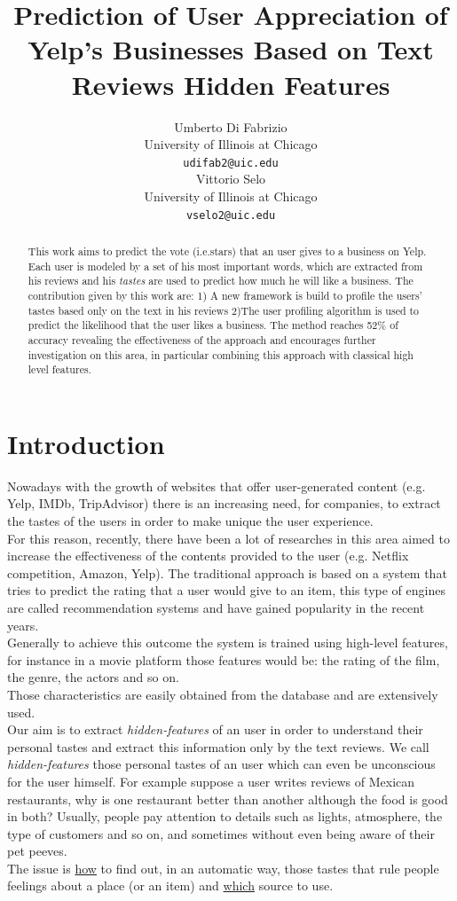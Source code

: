 \documentclass[11pt]{article}
\title{Prediction of User Appreciation of Yelp's Businesses Based on Text Reviews Hidden Features}
\author{Umberto Di Fabrizio \\
	University of Illinois at Chicago\\
	{\tt udifab2@uic.edu} \\\And
	Vittorio Selo \\
	University of Illinois at Chicago\\
	{\tt vselo2@uic.edu} \\}
\date{}
\begin{document}
\maketitle
\begin{abstract}
	This work aims to predict the vote (i.e.stars) that an user gives to a business on Yelp. Each user is modeled by a set of his most important words, which are extracted from his reviews and his \textit{tastes} are used to predict how much he will like a business. The contribution given by this work are: 1) A new framework is build to profile the users' tastes based only on the text in his reviews 2)The user profiling algorithm is used to predict the likelihood that the user likes a business. The method reaches 52\% of accuracy revealing the effectiveness of the approach and encourages further investigation on this area, in particular combining this approach with classical high level features.
\end{abstract}

\section{Introduction}

Nowadays with the growth of websites that offer user-generated content (e.g. Yelp, IMDb, TripAdvisor) there is an increasing need, for companies, to extract the tastes of the users in order to make unique the user experience.\\
For this reason, recently, there have been a lot of researches in this area aimed to increase the effectiveness of the contents provided to the user (e.g. Netflix competition\cite{Netflix}, Amazon, Yelp\cite{Nikulin}).
The traditional approach is based on a system that tries to predict the rating that a user would give to an item, this type of engines are called recommendation systems and have gained popularity in the recent years.\\
Generally to achieve this outcome the system is trained using high-level features, for instance in a movie platform those features would be: the rating of the film, the genre, the actors and so on.\\
Those characteristics are easily obtained from the database and are extensively used.\\
Our aim is to extract \textit{hidden-features} of an user in order to understand their personal tastes and extract this information only by the text reviews.
We call \textit{hidden-features} those personal tastes of an user which can even be unconscious for the user himself. 
For example suppose a user writes reviews of Mexican restaurants, why is one restaurant better than another although the food is good in both? Usually, people pay attention to details such as lights, atmosphere, the type of customers and so on, and sometimes without even being aware of their pet peeves.\\
The issue is \underline{how} to find out, in an automatic way, those tastes that rule people feelings about a place (or an item) and \underline{which} source to use.\\
\end{document}
